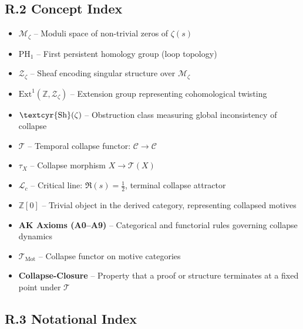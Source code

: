 \documentclass[11pt]{article}
\newcommand{\Sha}{\text{\textcyr{Sh}}}
\begin{document}
\subsection*{R.2 Concept Index}

\begin{itemize}
    \item \textbf{$\mathcal{M}_\zeta$} – Moduli space of non-trivial zeros of $\zeta(s)$
    \item \textbf{$\mathrm{PH}_1$} – First persistent homology group (loop topology)
    \item \textbf{$\mathcal{Z}_\zeta$} – Sheaf encoding singular structure over $\mathcal{M}_\zeta$
    \item \textbf{$\mathrm{Ext}^1(\mathbb{Z}, \mathcal{Z}_\zeta)$} – Extension group representing cohomological twisting
    \item \textbf{$\Sha(\zeta)$} – Obstruction class measuring global inconsistency of collapse
    \item \textbf{$\mathcal{T}$} – Temporal collapse functor: $\mathcal{C} \to \mathcal{C}$
    \item \textbf{$\tau_X$} – Collapse morphism $X \to \mathcal{T}(X)$
    \item \textbf{$\mathcal{L}_c$} – Critical line: $\Re(s) = \tfrac{1}{2}$, terminal collapse attractor
    \item \textbf{$\mathbb{Z}[0]$} – Trivial object in the derived category, representing collapsed motives
    \item \textbf{AK Axioms (A0–A9)} – Categorical and functorial rules governing collapse dynamics
    \item \textbf{$\mathcal{T}_{\mathrm{Mot}}$} – Collapse functor on motive categories
    \item \textbf{Collapse-Closure} – Property that a proof or structure terminates at a fixed point under $\mathcal{T}$
\end{itemize}

\subsection*{R.3 Notational Index}
\end{document}
